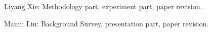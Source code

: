 
Liyang Xie: Methodology part, experiment part, paper revision. 

Manni Liu: Background Survey, presentation part, paper revision. 